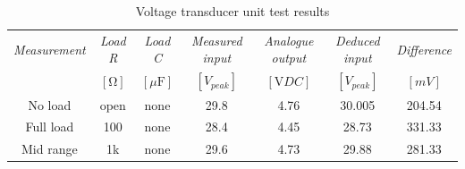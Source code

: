 \begin{table}[h]
        \centering
        \footnotesize
        \caption{Voltage transducer unit test results}
         \begin{tabular}{ccccccc}
          \toprule
             \textit{\footnotesize Measurement} & \textit{\footnotesize Load R} & \textit{\footnotesize Load C} & \textit{{\footnotesize Measured input}} & \textit{{\footnotesize Analogue output}} & \textit{\footnotesize Deduced input} & \textit{\footnotesize Difference}\\
             & $[\si{\ohm}]$ & $[\si{\mu\farad}]$ & $[V_{peak}]$ & $[\si{\volt}DC]$ & $[V_{peak}]$ & $[mV]$ \\
          \midrule
          No load & open & none & 29.8 & 4.76 & 30.005 & 204.54 \\
          Full load & 100 & none & 28.4 & 4.45 & 28.73 & 331.33 \\
          Mid range & 1k & none & 29.6 & 4.73 & 29.88 & 281.33 \\
          \bottomrule
        \end{tabular}
     \label{tab:voltage_integrated_test}
\end{table}
